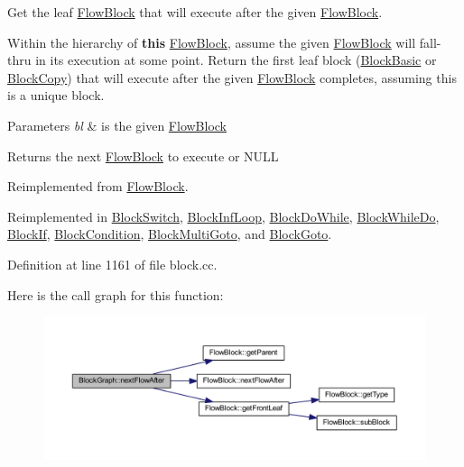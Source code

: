 Get the leaf \mbox{\hyperlink{class_flow_block}{Flow\+Block}} that will execute after the given \mbox{\hyperlink{class_flow_block}{Flow\+Block}}. 

Within the hierarchy of {\bfseries{this}} \mbox{\hyperlink{class_flow_block}{Flow\+Block}}, assume the given \mbox{\hyperlink{class_flow_block}{Flow\+Block}} will fall-\/thru in its execution at some point. Return the first leaf block (\mbox{\hyperlink{class_block_basic}{Block\+Basic}} or \mbox{\hyperlink{class_block_copy}{Block\+Copy}}) that will execute after the given \mbox{\hyperlink{class_flow_block}{Flow\+Block}} completes, assuming this is a unique block. 
\begin{DoxyParams}{Parameters}
{\em bl} & is the given \mbox{\hyperlink{class_flow_block}{Flow\+Block}} \\
\hline
\end{DoxyParams}
\begin{DoxyReturn}{Returns}
the next \mbox{\hyperlink{class_flow_block}{Flow\+Block}} to execute or N\+U\+LL 
\end{DoxyReturn}


Reimplemented from \mbox{\hyperlink{class_flow_block_a400c220d6c728958396286f54de6dd9e}{Flow\+Block}}.



Reimplemented in \mbox{\hyperlink{class_block_switch_ae13e717fc62265c1f9b5024cb0e9cd1a}{Block\+Switch}}, \mbox{\hyperlink{class_block_inf_loop_a10ef0de99961f931b7432b2662ac2677}{Block\+Inf\+Loop}}, \mbox{\hyperlink{class_block_do_while_a996ef387d4f6d645c38544d2aa4ba438}{Block\+Do\+While}}, \mbox{\hyperlink{class_block_while_do_a28f4f91e7ec3b4cc2bde0a0d432e0fe8}{Block\+While\+Do}}, \mbox{\hyperlink{class_block_if_adbc4cd5fb6cad60aa333c12532b55e1f}{Block\+If}}, \mbox{\hyperlink{class_block_condition_aefdc0e19b1623ebefa07b05b5bd85408}{Block\+Condition}}, \mbox{\hyperlink{class_block_multi_goto_a44d0021262e569ac4ecf6ecddbdf1d41}{Block\+Multi\+Goto}}, and \mbox{\hyperlink{class_block_goto_acc1628a26572e23d61f4b4dad717816e}{Block\+Goto}}.



Definition at line 1161 of file block.\+cc.

Here is the call graph for this function\+:
\nopagebreak
\begin{figure}[H]
\begin{center}
\leavevmode
\includegraphics[width=350pt]{class_block_graph_aba0d42cf572bdcf2bca44d22fad971f6_cgraph}
\end{center}
\end{figure}
\mbox{\label{class_block_graph_a1da91d469ca3583ac7408e90443f0e09}} 
